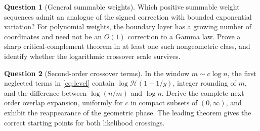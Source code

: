 \documentclass[11pt,a4paper]{article}
\numberwithin{equation}{section}
\theoremstyle{definition}
\newtheorem{question}{Question}
\theoremstyle{remark}
\newcommand{\HH}{\mathcal H}
\begin{document}
\begin{question}[General summable weights]
Which positive summable weight sequences admit an analogue of the
signed correction with bounded exponential variation? For polynomial
weights, the boundary layer has a growing number of coordinates and
need not be an $O(1)$ correction to a Gamma law. Prove a sharp
critical-complement theorem in at least one such nongeometric class,
and identify whether the logarithmic crossover scale survives.
\end{question}

\begin{question}[Second-order crossover terms]
In the window $m\sim c\log n$, the first neglected terms in
\eqref{eq:level} contain $\log\HH(1-1/y)$, integer rounding of $m$, and
the difference between $\log(n/m)$ and $\log n$. Derive the complete
next-order overlap expansion, uniformly for $c$ in compact subsets of
$(0,\infty)$, and exhibit the reappearance of the geometric phase.
The leading theorem gives the correct starting points for both
likelihood crossings.
\end{question}
\end{document}
